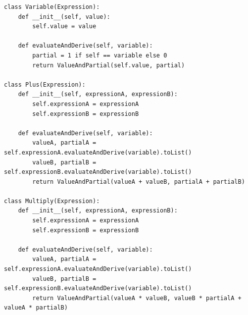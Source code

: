 \documentclass[zavrsnirad]{fer}
\begin{document}
\begin{lstlisting}[caption={Primjer implementacije unaprijedne metode u programskom jeziku \textit{Python} \cite{wiki:autodiff}}]
class Variable(Expression):
    def __init__(self, value):
        self.value = value

    def evaluateAndDerive(self, variable):
        partial = 1 if self == variable else 0
        return ValueAndPartial(self.value, partial)

class Plus(Expression):
    def __init__(self, expressionA, expressionB):
        self.expressionA = expressionA
        self.expressionB = expressionB

    def evaluateAndDerive(self, variable):
        valueA, partialA = self.expressionA.evaluateAndDerive(variable).toList()
        valueB, partialB = self.expressionB.evaluateAndDerive(variable).toList()
        return ValueAndPartial(valueA + valueB, partialA + partialB)

class Multiply(Expression):
    def __init__(self, expressionA, expressionB):
        self.expressionA = expressionA
        self.expressionB = expressionB

    def evaluateAndDerive(self, variable):
        valueA, partialA = self.expressionA.evaluateAndDerive(variable).toList()
        valueB, partialB = self.expressionB.evaluateAndDerive(variable).toList()
        return ValueAndPartial(valueA * valueB, valueB * partialA + valueA * partialB)
\end{lstlisting}
\end{document}
